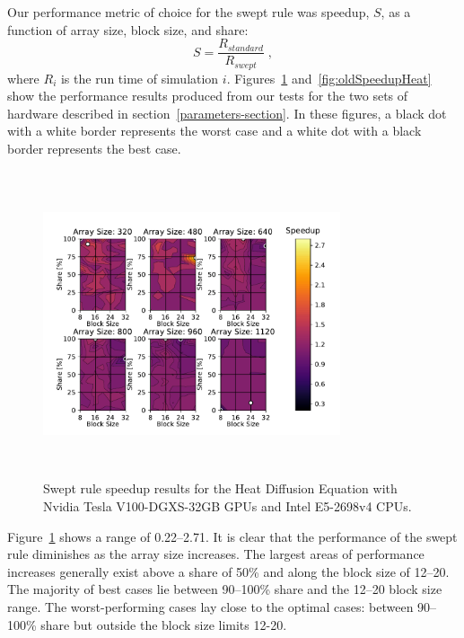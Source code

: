 \documentclass[preprints,article,accept,moreauthors,pdftex]{Definitions/mdpi}
\def\newCPU{Intel E5-2698v4} %
\def\newGPU{Nvidia Tesla V100-DGXS-32GB}
\begin{document}
Our performance metric of choice for the swept rule was speedup, $S$, as a function of array size, block size, and share:
\begin{equation}
    S = \frac{R_{\textit{standard}}}{R_{\textit{swept}}} \;,
\end{equation}
where $R_i$ is the run time of simulation $i$.
Figures~\ref{fig:newSpeedupHeat} and~\ref{fig:oldSpeedupHeat} show the performance results produced from our tests for the two sets of hardware described in section~\ref{parameters-section}. 
In these figures, a black dot with a white border represents the worst case and a white dot with a black border represents the best case.

\begin{figure}[htbp]
    \centering
    \includegraphics[height=9cm,width=0.78\textwidth, trim={0.75cm 0.4cm 0.8cm 0.7cm},clip]{figs/speedUpheatNew.pdf}
    \caption{Swept rule speedup results for the Heat Diffusion Equation with \newGPU{} GPUs and \newCPU{} CPUs.}
    \label{fig:newSpeedupHeat}
\end{figure}

Figure~\ref{fig:newSpeedupHeat} shows a range of 0.22--2.71. 
It is clear that the performance of the swept rule diminishes as the array size increases. The largest areas of performance increases generally exist above a share of 50\% and along the block size of 12--20. The majority of best cases lie between 90--100\% share and the 12--20 block size range. 
The worst-performing cases lay close to the optimal cases: between 90--100\% share but outside the block size limits 12-20.
\end{document}
